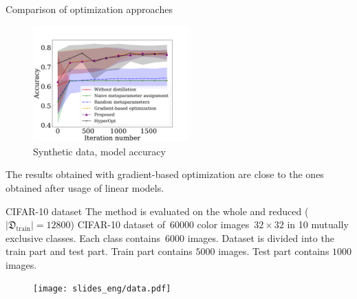 \documentclass[12pt, aspectratio=169]{beamer}
\begin{document}

\begin{frame}{Comparison of optimization approaches}
\begin{figure}
    \caption*{Synthetic data, model accuracy}
    \vspace{-1 cm}
    \includegraphics[width=0.53\textwidth]{synth_accuracy.pdf}
\end{figure}
The results obtained with gradient-based optimization are close to the ones obtained after usage of linear models.
\end{frame}

\begin{frame}{CIFAR-10 dataset}
    The method is evaluated on the whole and reduced ($|\mathfrak{D}_\text{train}|=12800$) CIFAR-10 dataset of~$60000$ color images~$32 \times 32$ in 10 mutually exclusive classes. Each class contains~$6000$ images. Dataset is divided into the train part and test part. Train part contains $5000$ images. Test part contains $1000$ images.
\begin{figure}
    \texttt{[image: slides\_eng/data.pdf]}
\end{figure}
\end{frame}
\end{document}
